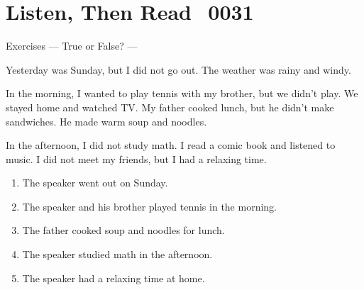 \documentclass[aspectratio=169,xcolor={dvipsnames,table}]{beamer}
\newcommand{\myaudio}[1]{\href{#1}{\faVolumeUp}}
\begin{document}
\section{Listen, Then Read\,\,\,\,\,{\tiny 0031}\,{\scriptsize \myaudio{./audio/026_past_ddnot_reading.mp3}}}
\begin{frame}[plain,t]{Exercises --- True or False? ---}
\begin{tcolorbox}[colframe=ForestGreen,
  colback=NavyBlue!10!white,
  colbacktitle=NavyBlue!40!white,
  coltitle=black, %
before upper={\setlength{\parindent}{1.25em}},
 title={A Quiet Day at Home\hfill{\tiny 0032}\quad{\scriptsize \myaudio{./audio/026_past_didnot_reading.mp3}}}
]
\noindent{}Yesterday was Sunday, but I did not go out. The weather was rainy and windy.

In the morning, I wanted to play tennis with my brother, but we didn't play. We stayed home and watched TV.
My father cooked lunch, but he didn't make sandwiches. He made warm soup and noodles.

In the afternoon, I did not study math. I read a comic book and listened to music. I did not meet my friends, but I had a relaxing time.
\end{tcolorbox}

\vspace{-4pt}
\begin{enumerate}\setlength{\itemsep}{-3.2pt}
\item<2-> The speaker went out on Sunday.\hfill{}
\item<2-> The speaker and his brother played tennis in the morning.\hfill{}
\item<2-> The father cooked soup and noodles for lunch.\hfill{}
\item<2-> The speaker studied math in the afternoon.\hfill{}
\item<2-> The speaker had a relaxing time at home.\hfill{}
\end{enumerate}
\end{frame}
\end{document}

